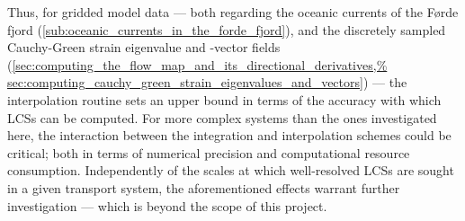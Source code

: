 Thus, for gridded model data --- both regarding the oceanic currents of the
Førde fjord (\cref{sub:oceanic_currents_in_the_forde_fjord}), and the
discretely sampled Cauchy-Green strain eigenvalue and -vector fields
(\cref{sec:computing_the_flow_map_and_its_directional_derivatives,%
sec:computing_cauchy_green_strain_eigenvalues_and_vectors}) --- the
interpolation routine sets an upper bound in terms of the accuracy with which
LCSs can be computed. For more complex systems than the ones investigated here,
the interaction between the integration and interpolation schemes could be
critical; both in terms of numerical precision and computational resource
consumption. Independently of the scales at which well-resolved LCSs are sought
in a given transport system, the aforementioned effects warrant further
investigation --- which is beyond the scope of this project.
